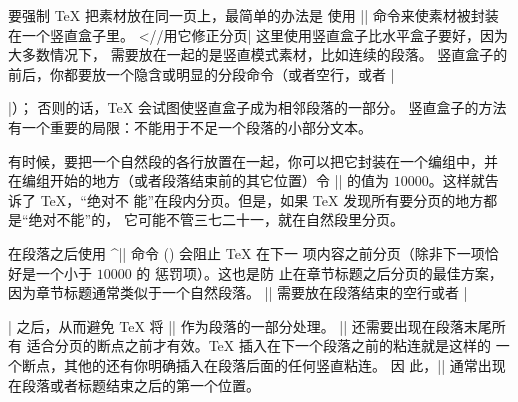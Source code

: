 要强制 \TeX{} 把素材放在同一页上，最简单的办法是
使用 |\vbox| 命令\ctsref{\vbox}来使素材被封装在一个竖直盒子里。
^^|\vbox//用它修正分页|
这里使用竖直盒子比水平盒子要好，因为大多数情况下，
需要放在一起的是竖直模式素材，比如连续的段落。
竖直盒子的前后，你都要放一个隐含或明显的分段命令（或者空行，或者 |\par|）；
否则的话，\TeX{} 会试图使竖直盒子成为相邻段落的一部分。
竖直盒子的方法有一个重要的局限：不能用于不足一个段落的小部分文本。



有时候，要把一个自然段的各行放置在一起，你可以把它封装在一个编组中，并
在编组开始的地方（或者段落结束前的其它位置）令 |\interlinepenalty|%
\ctsref{\interlinepenalty}的值为 $10000$。这样就告诉了 \TeX{}，“绝对不
能”在段内分页。但是，如果 \TeX{} 发现所有要分页的地方都是“绝对不能”的，
它可能不管三七二十一，就在自然段里分页。


在段落之后使用 ^|\nobreak| 命令 () 会阻止 \TeX{} 在下一
项内容之前分页（除非下一项恰好是一个小于 $10000$ 的 惩罚项）。这也是防
止在章节标题之后分页的最佳方案，因为章节标题通常类似于一个自然段落。
|\nobreak| 需要放在段落结束的空行或者 |\par| 之后，从而避免 \TeX{} 将
|\nobreak| 作为段落的一部分处理。 |\nobreak| 还需要出现在段落末尾所有
适合分页的断点之前才有效。\TeX{} 插入在下一个段落之前的粘连就是这样的
一个断点，其他的还有你明确插入在段落后面的任何竖直粘连。 因
此，|\nobreak| 通常出现在段落或者标题结束之后的第一个位置。

